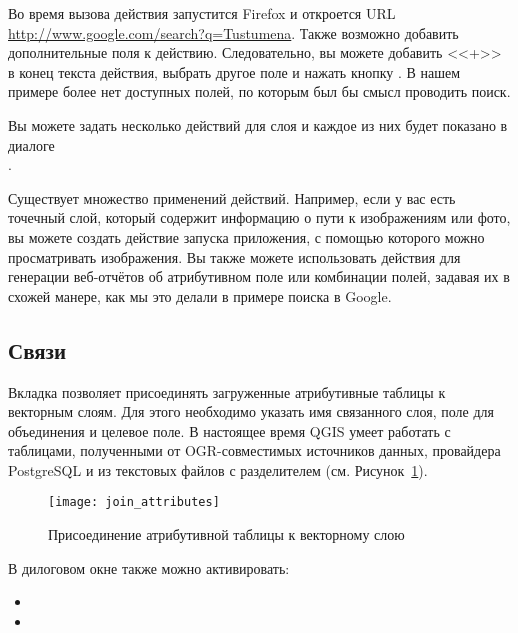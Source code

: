 Во время вызова действия запустится Firefox и откроется URL
\url{http://www.google.com/search?q=Tustumena}. Также возможно добавить
дополнительные поля к действию. Следовательно, вы можете добавить <<+>>
в конец текста действия, выбрать другое поле и нажать кнопку
. В нашем примере более нет доступных полей, по которым
был бы смысл проводить поиск.

Вы можете задать несколько действий для слоя и каждое из них будет показано в
диалоге \\
.

Существует множество применений действий. Например, если у вас есть точечный
слой, который содержит информацию о пути к изображениям или фото, вы можете
создать действие запуска приложения, с помощью которого можно просматривать
изображения. Вы также можете использовать действия для генерации веб-отчётов
об атрибутивном поле или комбинации полей, задавая их в схожей манере, как
мы это делали в примере поиска в Google.

\subsection{Связи}\label{sec:joins}

Вкладка  позволяет присоединять загруженные атрибутивные таблицы
к векторным слоям. Для этого необходимо указать имя связанного слоя, поле
для объединения и целевое поле. В настоящее время QGIS умеет работать с
таблицами, полученными от OGR-совместимых источников данных, провайдера
PostgreSQL и из текстовых файлов с разделителем (см. Рисунок~\ref{fig:join_attributes}).

\begin{figure}[ht]
   \centering
   \texttt{[image: join\_attributes]}
   \caption{Присоединение атрибутивной таблицы к векторному слою \wincaption}
   \label{fig:join_attributes}
\end{figure}

В дилоговом окне также можно активировать:

\begin{itemize}[label=--]
\item {}
\item {}
\end{itemize}

